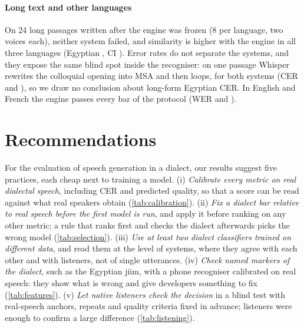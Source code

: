 \documentclass[11pt]{article}
\newcommand{\vox}{VoxCPM2\xspace}
\begin{document}
\begin{table}[t]
\centering\small
\begin{adjustbox}{max width=\linewidth}
\end{adjustbox}
\caption{Ablations on held-out sentences (one seed, the same utterances in every row). Each middle row removes one
component; the last row is \vox used directly. Bold: the paired 95\% interval of the difference from the full engine
excludes zero. CER$_\text{canon.}$: CER after mapping spellings of the same loanword to one form.}
\label{tab:ablation}
\end{table}

\paragraph{Long text and other languages}
On 24 long passages written after the engine was frozen (8 per language, two voices each), neither system failed, and
similarity is higher with the engine in all three languages (Egyptian , CI
). Error rates do not separate the systems, and they expose the same blind spot inside the
recogniser: on one passage Whisper rewrites the colloquial opening into MSA and then loops, for both systems
(CER  and ), so we draw no conclusion about long-form Egyptian CER.
In English and French the engine passes every bar of the protocol (WER  and ).

\section{Recommendations}\label{sec:recommendations}
For the evaluation of speech generation in a dialect, our results suggest five practices, each cheap next to training a
model. (i) \emph{Calibrate every metric on real dialectal speech}, including CER and predicted quality, so that a score
can be read against what real speakers obtain (\cref{tab:calibration}). (ii) \emph{Fix a dialect bar relative to real
speech before the first model is run}, and apply it before ranking on any other metric; a rule that ranks first and
checks the dialect afterwards picks the wrong model (\cref{tab:selection}). (iii) \emph{Use at least two dialect
classifiers trained on different data}, and read them at the level of systems, where they agree with each other and
with listeners, not of single utterances. (iv) \emph{Check named markers of the dialect}, such as the Egyptian jiim,
with a phone recogniser calibrated on real speech: they show what is wrong and give developers something to fix
(\cref{tab:features}). (v) \emph{Let native listeners check the decision} in a blind test with real-speech anchors,
repeats and quality criteria fixed in advance;  listeners were enough to confirm a large difference
(\cref{tab:listening}).
\end{document}
